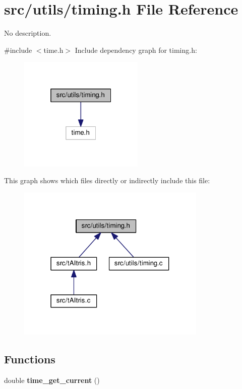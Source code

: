 \section{src/utils/timing.h File Reference}
\label{timing_8h}


No description.  


{\ttfamily \#include $<$time.\+h$>$}\newline
Include dependency graph for timing.\+h\+:
\nopagebreak
\begin{figure}[H]
\begin{center}
\leavevmode
\includegraphics[width=169pt]{timing_8h__incl}
\end{center}
\end{figure}
This graph shows which files directly or indirectly include this file\+:
\nopagebreak
\begin{figure}[H]
\begin{center}
\leavevmode
\includegraphics[width=256pt]{timing_8h__dep__incl}
\end{center}
\end{figure}
\subsection*{Functions}
\begin{DoxyCompactItemize}
\item 
double \textbf{ time\+\_\+get\+\_\+current} ()
\end{DoxyCompactItemize}


